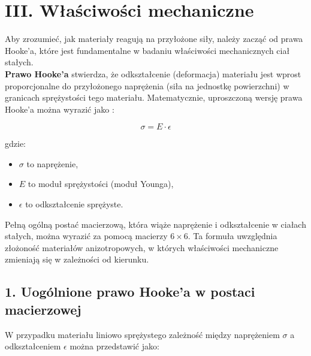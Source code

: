 {}
\justify
\fontsize{14}{16}\selectfont
\setlength{\parindent}{0pt}
\chapter*{III. Właściwości mechaniczne \cite{alma991000386409708832, kittel1976wstep, alma991001031769708832, alma991053253943408832}} 
\fontsize{12}{14}\selectfont
\vspace{\baselineskip} 

\hspace{1.5cm} Aby zrozumieć, jak materiały reagują na przyłożone siły, należy zacząć od prawa Hooke'a, które jest fundamentalne w badaniu właściwości mechanicznych ciał stałych. \\
\hspace{1.5cm} \textbf{Prawo Hooke'a} stwierdza, że odkształcenie (deformacja) materiału jest wprost proporcjonalne do przyłożonego naprężenia (siła na jednostkę powierzchni) w granicach sprężystości tego materiału. Matematycznie, uproszczoną wersję prawa Hooke'a można wyrazić jako \cite{alma991053253943408832, alma991000386409708832}:

$$
\sigma = E \cdot \epsilon
$$

gdzie:
\begin{itemize}
 \item  $\sigma$ to naprężenie,
 \item  $E$ to moduł sprężystości (moduł Younga),
 \item  $\epsilon$ to odkształcenie sprężyste.
\end{itemize}


Pełną ogólną postać macierzową, która wiąże naprężenie i odkształcenie w ciałach stałych, można wyrazić za pomocą macierzy $6 \times 6$. Ta formuła uwzględnia złożoność materiałów anizotropowych, w których właściwości mechaniczne zmieniają się w zależności od kierunku.
{}
\section*{1. Uogólnione prawo Hooke'a w postaci macierzowej \cite{kittel1976wstep, alma991001031769708832}}
\vspace{-1.0em}
\hspace{1.5cm} W przypadku materiału liniowo sprężystego zależność między naprężeniem $\sigma$ a odkształceniem $\epsilon$ można przedstawić jako:

